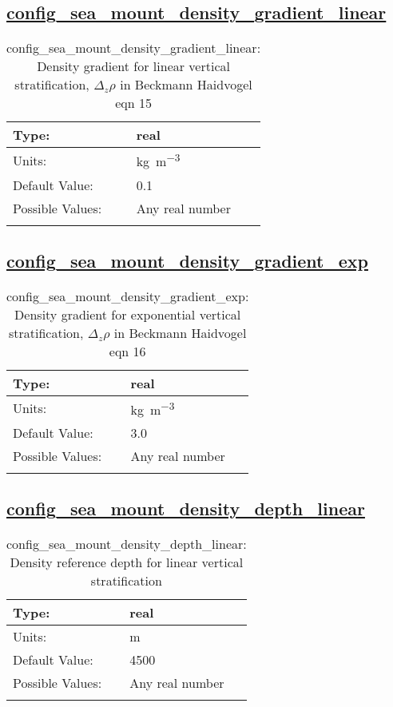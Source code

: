 \subsection[config\_sea\_mount\_density\_gradient\_linear]{\hyperref[sec:nm_tab_sea_mount]{config\_sea\_mount\_density\_gradient\_linear}}
\label{subsec:nm_sec_config_sea_mount_density_gradient_linear}
\begin{center}
\begin{longtable}{| p{2.0in} || p{4.0in} |}
    \hline
    Type: & real \\
    \hline
    Units: & \si{kg.m^{-3}} \\
    \hline
    Default Value: & 0.1 \\
    \hline
    Possible Values: & Any real number \\
    \hline
    \caption{config\_sea\_mount\_density\_gradient\_linear: Density gradient for linear vertical stratification, $\Delta_z \rho$ in Beckmann Haidvogel eqn 15}
\end{longtable}
\end{center}
\subsection[config\_sea\_mount\_density\_gradient\_exp]{\hyperref[sec:nm_tab_sea_mount]{config\_sea\_mount\_density\_gradient\_exp}}
\label{subsec:nm_sec_config_sea_mount_density_gradient_exp}
\begin{center}
\begin{longtable}{| p{2.0in} || p{4.0in} |}
    \hline
    Type: & real \\
    \hline
    Units: & \si{kg.m^{-3}} \\
    \hline
    Default Value: & 3.0 \\
    \hline
    Possible Values: & Any real number \\
    \hline
    \caption{config\_sea\_mount\_density\_gradient\_exp: Density gradient for exponential vertical stratification, $\Delta_z \rho$ in Beckmann Haidvogel eqn 16}
\end{longtable}
\end{center}
\subsection[config\_sea\_mount\_density\_depth\_linear]{\hyperref[sec:nm_tab_sea_mount]{config\_sea\_mount\_density\_depth\_linear}}
\label{subsec:nm_sec_config_sea_mount_density_depth_linear}
\begin{center}
\begin{longtable}{| p{2.0in} || p{4.0in} |}
    \hline
    Type: & real \\
    \hline
    Units: & \si{m} \\
    \hline
    Default Value: & 4500 \\
    \hline
    Possible Values: & Any real number \\
    \hline
    \caption{config\_sea\_mount\_density\_depth\_linear: Density reference depth for linear vertical stratification}
\end{longtable}
\end{center}
